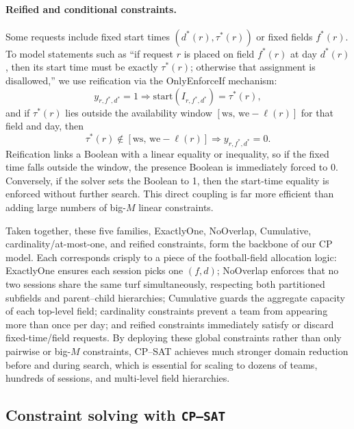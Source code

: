 \documentclass[12pt]{article}
\begin{document}
\paragraph{Reified and conditional constraints.}
Some requests include fixed start times \((d^*(r),\tau^*(r))\) or fixed fields \(f^*(r)\). To model statements such as “if request \(r\) is placed on field \(f^*(r)\) at day \(d^*(r)\), then its start time must be exactly \(\tau^*(r)\); otherwise that assignment is disallowed,” we use reification via the OnlyEnforceIf mechanism:
\[
  y_{r,f^*,d^*} = 1 \Longrightarrow \text{start}(I_{r,f^*,d^*}) = \tau^*(r),
\]
and if \(\tau^*(r)\) lies outside the availability window \([\text{ws},\,\text{we}-\ell(r)]\) for that field and day, then
\[
  \tau^*(r)\not\in[\text{ws},\,\text{we}-\ell(r)]
  \Longrightarrow y_{r,f^*,d^*} = 0.
\]
Reification links a Boolean with a linear equality or inequality, so if the fixed time falls outside the window, the presence Boolean is immediately forced to 0. Conversely, if the solver sets the Boolean to 1, then the start-time equality is enforced without further search. This direct coupling is far more efficient than adding large numbers of big-\(M\) linear constraints.

\bigskip

Taken together, these five families, ExactlyOne, NoOverlap, Cumulative, cardinality/at-most-one, and reified constraints, form the backbone of our CP model. Each corresponds crisply to a piece of the football-field allocation logic: ExactlyOne ensures each session picks one \((f,d)\); NoOverlap enforces that no two sessions share the same turf simultaneously, respecting both partitioned subfields and parent–child hierarchies; Cumulative guards the aggregate capacity of each top-level field; cardinality constraints prevent a team from appearing more than once per day; and reified constraints immediately satisfy or discard fixed-time/field requests. By deploying these global constraints rather than only pairwise or big-\(M\) constraints, CP–SAT achieves much stronger domain reduction before and during search, which is essential for scaling to dozens of teams, hundreds of sessions, and multi-level field hierarchies.


\subsection{Constraint solving with \texttt{CP--SAT}}
\label{sec:cp_sat_solver}
\end{document}
